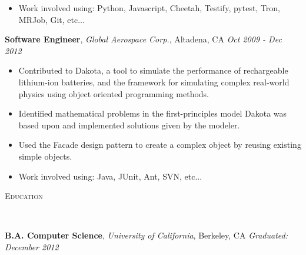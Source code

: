 \documentclass{article}
\newenvironment{changemargin}[2]{%
  \begin{list}{}{%
    \setlength{\topsep}{0pt}%
    \setlength{\leftmargin}{#1}%
    \setlength{\rightmargin}{#2}%
    \setlength{\listparindent}{\parindent}%
    \setlength{\itemindent}{\parindent}%
    \setlength{\parsep}{\parskip}%
  }%
  \item[]}{\end{list}
}
\newcommand{\lineover}{
  \begin{changemargin}{-0.05in}{-0.05in}
    \vspace*{-8pt}
    \hrulefill \\
    \vspace*{-2pt}
  \end{changemargin}
}
\newcommand{\header}[1]{
  \begin{changemargin}{-0.5in}{-0.5in}
    \scshape{#1}\\
  \lineover
  \end{changemargin}
}
\newenvironment{body} {
  \vspace*{-16pt}
  \begin{changemargin}{-0.25in}{-0.5in}
  }
  {\end{changemargin}
}
\begin{document}
\begin{body}
\begin{itemize}
    \item Work involved using: Python, Javascript, Cheetah, Testify, pytest, Tron, MRJob, Git, etc...

  \end{itemize}

  \textbf {Software Engineer}, \emph{Global Aerospace Corp.}, Altadena, CA \hfill \emph{Oct 2009 - Dec 2012}\\
  \vspace*{-4pt}
  \begin{itemize} \itemsep -0pt
    \item Contributed to Dakota, a tool to simulate the performance of rechargeable lithium-ion batteries, and the framework for simulating complex real-world physics using object oriented programming methods.
    \item Identified mathematical problems in the first-principles model Dakota was based upon and implemented solutions given by the modeler.
    \item Used the Facade design pattern to create a complex object by reusing existing simple objects.
    \item Work involved using: Java, JUnit, Ant, SVN, etc...
  \end{itemize}
\end{body}

\smallskip


\header{Education}

\begin{body}
  \vspace{14pt}
  \textbf{B.A. Computer Science}, \emph{University of California}, Berkeley, CA \hfill \emph{Graduated: December 2012} \\
\end{body}

\smallskip
\end{document}
